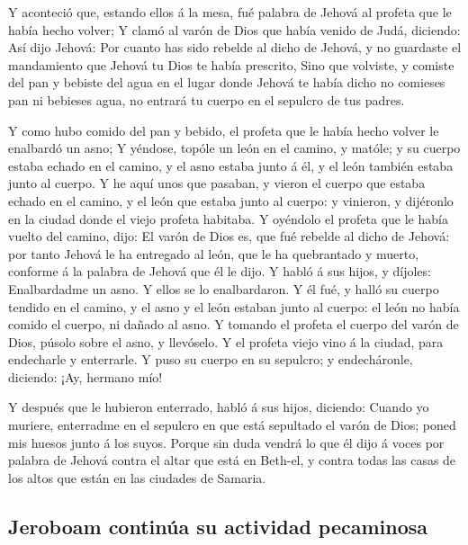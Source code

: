  Y aconteció que, estando ellos á la mesa, fué palabra de
Jehová al profeta que le había hecho volver;  Y clamó al
varón de Dios que había venido de Judá, diciendo: Así dijo Jehová: Por
cuanto has sido rebelde al dicho de Jehová, y no guardaste el
mandamiento que Jehová tu Dios te había prescrito,  Sino
que volviste, y comiste del pan y bebiste del agua en el lugar donde
Jehová te había dicho no comieses pan ni bebieses agua, no entrará tu
cuerpo en el sepulcro de tus padres.

 Y como hubo comido del pan y bebido, el profeta que le
había hecho volver le enalbardó un asno;  Y yéndose, topóle
un león en el camino, y matóle; y su cuerpo estaba echado en el camino,
y el asno estaba junto á él, y el león también estaba junto al cuerpo.
 Y he aquí unos que pasaban, y vieron el cuerpo que estaba
echado en el camino, y el león que estaba junto al cuerpo: y vinieron, y
dijéronlo en la ciudad donde el viejo profeta habitaba.  Y
oyéndolo el profeta que le había vuelto del camino, dijo: El varón de
Dios es, que fué rebelde al dicho de Jehová: por tanto Jehová le ha
entregado al león, que le ha quebrantado y muerto, conforme á la palabra
de Jehová que él le dijo.  Y habló á sus hijos, y díjoles:
Enalbardadme un asno. Y ellos se lo enalbardaron.  Y él
fué, y halló su cuerpo tendido en el camino, y el asno y el león estaban
junto al cuerpo: el león no había comido el cuerpo, ni dañado al asno.
 Y tomando el profeta el cuerpo del varón de Dios, púsolo
sobre el asno, y llevóselo. Y el profeta viejo vino á la ciudad, para
endecharle y enterrarle.  Y puso su cuerpo en su sepulcro;
y endecháronle, diciendo: ¡Ay, hermano mío!

 Y después que le hubieron enterrado, habló á sus hijos,
diciendo: Cuando yo muriere, enterradme en el sepulcro en que está
sepultado el varón de Dios; poned mis huesos junto á los suyos.
 Porque sin duda vendrá lo que él dijo á voces por palabra
de Jehová contra el altar que está en Beth-el, y contra todas las casas
de los altos que están en las ciudades de Samaria.

\hypertarget{jeroboam-continuxfaa-su-actividad-pecaminosa}{%
\subsection{Jeroboam continúa su actividad
pecaminosa}\label{jeroboam-continuxfaa-su-actividad-pecaminosa}}

